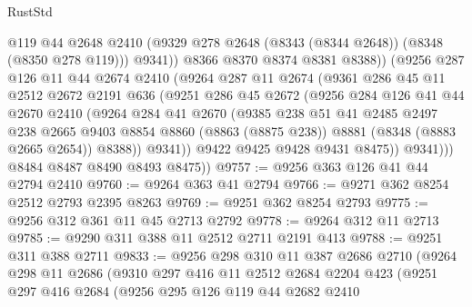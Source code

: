 \begin{lexlean}{RustStd}
\begin{coremodule}
                    @119
                    @44
                    @2648
                    @2410
                    (@9329 @278 @2648 (@8343 (@8344 @2648)) (@8348 (@8350 @278 @119)))
                    @9341))
                @8366
                @8370
                @8374
                @8381
                @8388))
            (@9256
              @287
              @126
              @11
              @44
              @2674
              @2410
              (@9264
                @287
                @11
                @2674
                (@9361
                  @286
                  @45
                  @11
                  @2512
                  @2672
                  @2191
                  @636
                  (@9251
                    @286
                    @45
                    @2672
                    (@9256
                      @284
                      @126
                      @41
                      @44
                      @2670
                      @2410
                      (@9264
                        @284
                        @41
                        @2670
                        (@9385
                          @238
                          @51
                          @41
                          @2485
                          @2497
                          @238
                          @2665
                          @9403
                          @8854
                          @8860
                          (@8863 (@8875 @238))
                          @8881
                          (@8348 (@8883 @2665 @2654))
                          @8388))
                      @9341))
                  @9422
                  @9425
                  @9428
                  @9431
                  @8475))
              @9341)))
        @8484
        @8487
        @8490
        @8493
        @8475))
@9757 := @9256 @363 @126 @41 @44 @2794 @2410
@9760 := @9264 @363 @41 @2794
@9766 := @9271 @362 @8254 @2512 @2793 @2395 @8263
@9769 := @9251 @362 @8254 @2793
@9775 := @9256 @312 @361 @11 @45 @2713 @2792
@9778 := @9264 @312 @11 @2713
@9785 := @9290 @311 @388 @11 @2512 @2711 @2191 @413
@9788 := @9251 @311 @388 @2711
@9833 := @9256
    @298
    @310
    @11
    @387
    @2686
    @2710
    (@9264
      @298
      @11
      @2686
      (@9310
        @297
        @416
        @11
        @2512
        @2684
        @2204
        @423
        (@9251
          @297
          @416
          @2684
          (@9256
            @295
            @126
            @119
            @44
            @2682
            @2410

\end{coremodule}
\end{lexlean}
